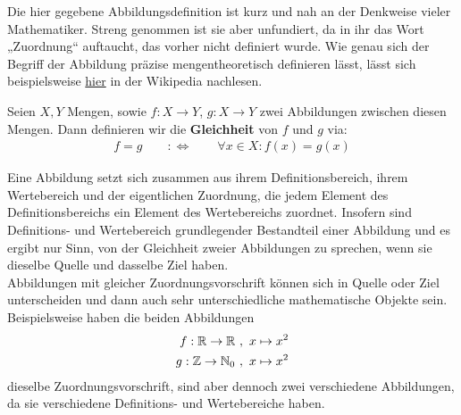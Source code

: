 \begin{bem}
	Die hier gegebene Abbildungsdefinition ist kurz und nah an der Denkweise vieler Mathematiker. Streng genommen ist sie aber unfundiert, da in ihr das Wort „Zuordnung“ auftaucht, das vorher nicht definiert wurde. Wie genau sich der Begriff der Abbildung präzise mengentheoretisch definieren lässt, lässt sich beispielsweise \href{https://de.wikipedia.org/wiki/Funktion_(Mathematik)#Mengentheoretische_Definition}{hier} in der Wikipedia nachlesen.
	
\end{bem}
\begin{de} \label{abbgleich}
	Seien $X,Y$ Mengen, sowie $f: X \to Y$, $g: X \to Y$ zwei Abbildungen
	zwischen diesen Mengen. Dann definieren wir die \textbf{Gleichheit} von $f$ und $g$ via:
	\begin{align*}
		f = g \qquad:\Leftrightarrow\qquad \forall x \in X: f(x) = g(x)
	\end{align*}
\end{de}



\begin{bem}
Eine Abbildung setzt sich zusammen aus ihrem Definitionsbereich, ihrem Wertebereich und der eigentlichen Zuordnung, die jedem Element des Definitionsbereichs ein Element des Wertebereichs zuordnet. Insofern sind Definitions- und Wertebereich grundlegender Bestandteil einer Abbildung und es ergibt nur Sinn, von der Gleichheit zweier Abbildungen zu sprechen, wenn sie dieselbe Quelle und dasselbe Ziel haben. \\
Abbildungen mit gleicher Zuordnungsvorschrift können sich in Quelle oder Ziel unterscheiden und dann auch sehr unterschiedliche mathematische Objekte sein. Beispielsweise haben die beiden Abbildungen
	\begin{align*}
	 f : {\mathbb R} \to {\mathbb R} \ & ,\ x\mapsto x^2 \\
	 g : {\mathbb Z} \to {\mathbb N}_0 \ & ,\ x\mapsto x^2
	\end{align*}
	dieselbe Zuordnungsvorschrift, sind aber dennoch zwei verschiedene Abbildungen, da sie verschiedene Definitions- und Wertebereiche haben.
\end{bem}


